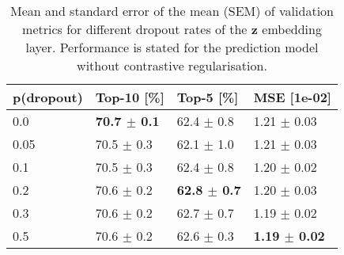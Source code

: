 \begin{table}[h]
\caption{Mean and standard error of the mean (SEM) of validation metrics for different dropout rates of the $\mathbf{z}$ embedding layer. Performance is stated for the prediction model without contrastive regularisation. }
\label{tab:dropout}
\begin{tabular}{llll}
\toprule
p(dropout) & Top-10 [\%] & Top-5 [\%] & MSE [1e-02] \\
\midrule
0.0 & \textbf{70.7 $\pm$ 0.1} & 62.4 $\pm$ 0.8 & 1.21 $\pm$ 0.03 \\
0.05 & 70.5 $\pm$ 0.3 & 62.1 $\pm$ 1.0 & 1.21 $\pm$ 0.03 \\
0.1 & 70.5 $\pm$ 0.3 & 62.4 $\pm$ 0.8 & 1.20 $\pm$ 0.02 \\
0.2 & 70.6 $\pm$ 0.2 & \textbf{62.8 $\pm$ 0.7} & 1.20 $\pm$ 0.03 \\
0.3 & 70.6 $\pm$ 0.2 & 62.7 $\pm$ 0.7 & 1.19 $\pm$ 0.02 \\
0.5 & 70.6 $\pm$ 0.2 & 62.6 $\pm$ 0.3 & \textbf{1.19 $\pm$ 0.02} \\
\bottomrule
\end{tabular}
\end{table}
